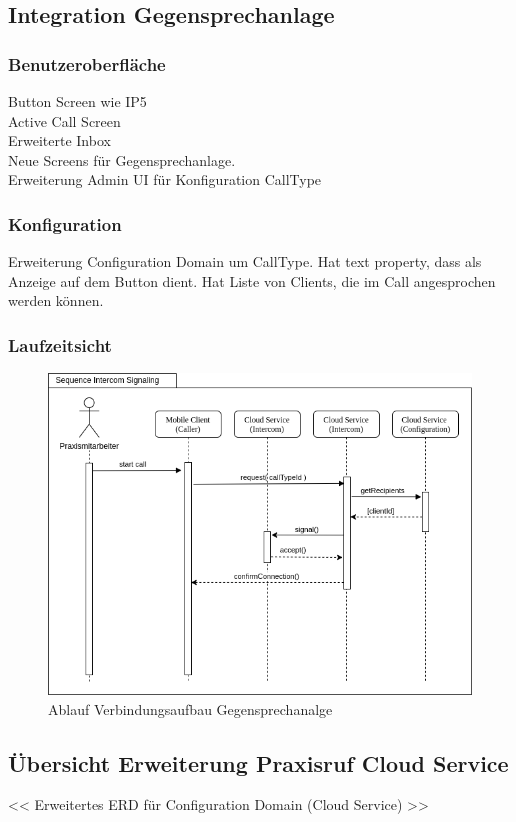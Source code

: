 \subsection{Integration Gegensprechanlage}

\subsubsection*{Benutzeroberfläche}

Button Screen wie IP5 \\
Active Call Screen \\
Erweiterte Inbox \\
Neue Screens für Gegensprechanlage. \\
Erweiterung Admin UI für Konfiguration CallType \\


\subsubsection*{Konfiguration}
Erweiterung Configuration Domain um CallType.
Hat text property, dass als Anzeige auf dem Button dient.
Hat Liste von Clients, die im Call angesprochen werden können.

\subsubsection*{Laufzeitsicht}

\begin{figure}[h]
    \centering
    \begin{minipage}[b]{0.9\textwidth}
        \includegraphics[width=\textwidth]{graphics/diagramms/Sequence_Intercom_Broking_V01}
        \caption{Ablauf Verbindungsaufbau Gegensprechanalge}
    \end{minipage}
\end{figure}

\clearpage

\subsection{Übersicht Erweiterung Praxisruf Cloud Service}

<< Erweitertes ERD für Configuration Domain (Cloud Service) >>

\clearpage
